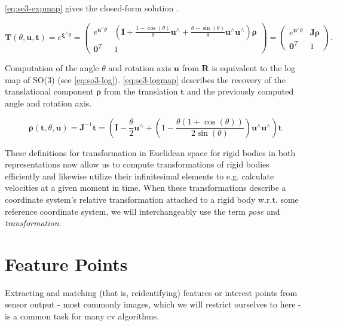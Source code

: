 \documentclass[headsepline, hidelinks, footsepline, footinclude=false, oneside, fontsize=11pt, paper=a4, listof=totoc, bibliography=totoc]{scrbook}
\begin{document}
\cref{eq:se3-expmap} gives the closed-form solution \cite{murrayMathematicalIntroductionRobotic1994}.

\begin{equation}
\label{eq:se3-expmap}
\mathbf{T}(\theta, \mathbf{u}, \mathbf{t}) = e^{\boldsymbol{\xi}^\wedge\theta}
= \begin{pmatrix} e^{\mathbf{u}^\wedge \theta} & (\mathbf{I} + \frac{1-\cos(\theta)}{\theta}\mathbf{u}^\wedge + \frac{\theta - \sin(\theta)}{\theta}\mathbf{u}^\wedge \mathbf{u}^\wedge )\boldsymbol{\rho} \\ \mathbf{0}^T & 1\end{pmatrix}
= \begin{pmatrix} e^{\mathbf{u}^\wedge \theta} & \mathbf{J}\boldsymbol{\rho} \\ \mathbf{0}^T & 1\end{pmatrix}.
\end{equation}

Computation of the angle \(\theta\) and rotation axis \(\mathbf{u}\) from \(\mathbf{R}\) is equivalent to the log map of SO(3) (see \cref{eq:so3-log}). \cref{eq:se3-logmap} describes the recovery of the 
translational component \(\boldsymbol{\rho}\) from the translation \(\mathbf{t}\) and the previously computed angle and rotation axis.

\begin{equation}
\label{eq:se3-logmap}
\boldsymbol{\rho}(\mathbf{t}, \theta, \mathbf{u}) = \mathbf{J}^{-1}\mathbf{t} = (\mathbf{I} - \frac{\theta}{2}\mathbf{u}^\wedge + (1 - \frac{\theta(1+\cos(\theta))}{2\sin(\theta)})\mathbf{u}^\wedge\mathbf{u}^\wedge)\mathbf{t}
\end{equation}

These definitions for transformation in Euclidean space for rigid bodies in both representations now allow us to compute transformations of rigid bodies efficiently and likewise utilize their infinitesimal elements to e.g.
calculate velocities at a given moment in time. When these transformations describe a coordinate system's relative transformation attached to a rigid body w.r.t. some reference coordinate system, we will interchangeably use
the term \emph{pose} and \emph{transformation}.

\section{Feature Points \label{feature-points}}
\label{sec:org4e82c32}
Extracting and matching (that is, reidentifying) features or interest points from sensor output - most commonly images, which we will restrict ourselves to here - is a common task for many \gls{cv} algorithms. 
\end{document}
